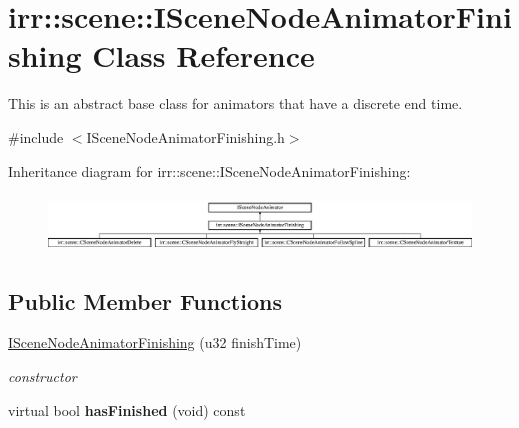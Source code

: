 \hypertarget{classirr_1_1scene_1_1_i_scene_node_animator_finishing}{\section{irr\-:\-:scene\-:\-:I\-Scene\-Node\-Animator\-Finishing Class Reference}
\label{classirr_1_1scene_1_1_i_scene_node_animator_finishing}
}


This is an abstract base class for animators that have a discrete end time.  




{\ttfamily \#include $<$I\-Scene\-Node\-Animator\-Finishing.\-h$>$}

Inheritance diagram for irr\-:\-:scene\-:\-:I\-Scene\-Node\-Animator\-Finishing\-:\begin{figure}[H]
\begin{center}
\leavevmode
\includegraphics[height=1.521739cm]{classirr_1_1scene_1_1_i_scene_node_animator_finishing}
\end{center}
\end{figure}
\subsection*{Public Member Functions}
\begin{DoxyCompactItemize}
\item 
\hypertarget{classirr_1_1scene_1_1_i_scene_node_animator_finishing_a3b1db1e2db8412665b8d88e8f64712d9}{\hyperlink{classirr_1_1scene_1_1_i_scene_node_animator_finishing_a3b1db1e2db8412665b8d88e8f64712d9}{I\-Scene\-Node\-Animator\-Finishing} (u32 finish\-Time)}\label{classirr_1_1scene_1_1_i_scene_node_animator_finishing_a3b1db1e2db8412665b8d88e8f64712d9}

\begin{DoxyCompactList}\small\item\em constructor \end{DoxyCompactList}\item 
\hypertarget{classirr_1_1scene_1_1_i_scene_node_animator_finishing_a300184e5d3e2fe4247927b5be91dd172}{virtual bool {\bfseries has\-Finished} (void) const }\label{classirr_1_1scene_1_1_i_scene_node_animator_finishing_a300184e5d3e2fe4247927b5be91dd172}

\end{DoxyCompactItemize}
